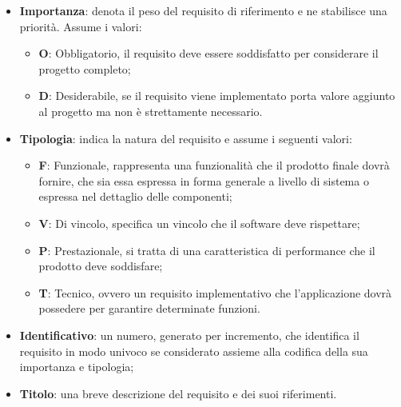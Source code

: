 	\begin{itemize}
		\item \textbf{Importanza}: denota il peso del requisito di riferimento e ne stabilisce una priorità. Assume i valori:
		\begin{itemize}
			\item \textbf{O}: Obbligatorio, il requisito deve essere soddisfatto per considerare il progetto completo;
			\item \textbf{D}: Desiderabile, se il requisito viene implementato porta valore aggiunto al progetto ma non è strettamente necessario. 
		\end{itemize}
		
		\item \textbf{Tipologia}: indica la natura del requisito e assume i seguenti valori:
		\begin{itemize}
			\item \textbf{F}: Funzionale, rappresenta una funzionalità che il prodotto finale dovrà fornire, che sia essa espressa in forma generale a livello di sistema o espressa nel dettaglio delle componenti;
			\item \textbf{V}: Di vincolo, specifica un vincolo che il software deve rispettare;
			\item \textbf{P}: Prestazionale, si tratta di una caratteristica di performance che il prodotto deve soddisfare;
			\item \textbf{T}: Tecnico, ovvero un requisito implementativo che l'applicazione dovrà possedere per garantire determinate funzioni.
		\end{itemize}
		
		\item \textbf{Identificativo}: un numero, generato per incremento, che identifica il requisito in modo univoco se considerato assieme alla codifica della sua importanza e tipologia;
		
		\item \textbf{Titolo}: una breve descrizione del requisito e dei suoi riferimenti.
	\end{itemize}
	
	
